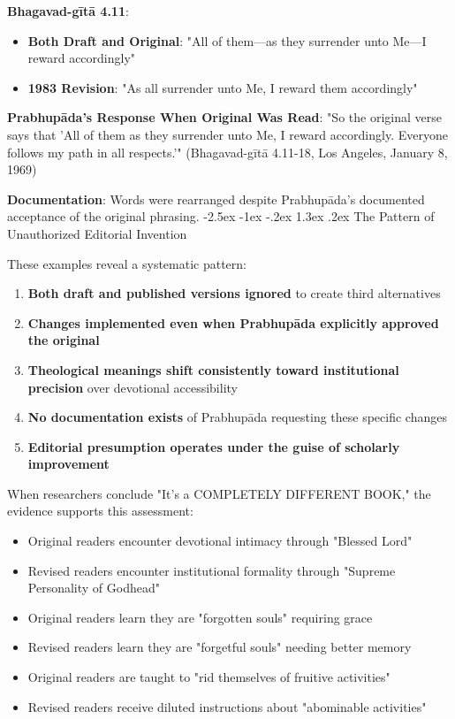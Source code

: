 \documentclass[12pt,twoside]{book}
\makeatletter
\renewcommand\section{\@startsection{section}{1}{\z@}%
{-2.5ex \@plus -1ex \@minus -.2ex}%
{1.3ex \@plus.2ex}%
{\normalfont\Large\bfseries}}
\makeatother
\begin{document}
\textbf{\textbf{Bhagavad-gītā 4.11}}:
\begin{itemize}
\item \textbf{\textbf{Both Draft and Original}}: "All of them—as they surrender unto Me—I reward accordingly"
\item \textbf{\textbf{1983 Revision}}: "As all surrender unto Me, I reward them accordingly"
\end{itemize}

\textbf{\textbf{Prabhupāda's Response When Original Was Read}}: "So the original verse says that 'All of them as they surrender unto Me, I reward accordingly. Everyone follows my path in all respects.'" (Bhagavad-gītā 4.11-18, Los Angeles, January 8, 1969)

\textbf{\textbf{Documentation}}: Words were rearranged despite Prabhupāda's documented acceptance of the original phrasing.
\section{The Pattern of Unauthorized Editorial Invention}
\label{sec:org23a3934}

These examples reveal a systematic pattern:
\begin{enumerate}
\item \textbf{\textbf{Both draft and published versions ignored}} to create third alternatives
\item \textbf{\textbf{Changes implemented even when Prabhupāda explicitly approved the original}}
\item \textbf{\textbf{Theological meanings shift consistently toward institutional precision}} over devotional accessibility
\item \textbf{\textbf{No documentation exists}} of Prabhupāda requesting these specific changes
\item \textbf{\textbf{Editorial presumption operates under the guise of scholarly improvement}}
\end{enumerate}

When researchers conclude "It's a COMPLETELY DIFFERENT BOOK," the evidence supports this assessment:

\begin{itemize}
\item Original readers encounter devotional intimacy through "Blessed Lord"
\item Revised readers encounter institutional formality through "Supreme Personality of Godhead"
\item Original readers learn they are "forgotten souls" requiring grace
\item Revised readers learn they are "forgetful souls" needing better memory
\item Original readers are taught to "rid themselves of fruitive activities"
\item Revised readers receive diluted instructions about "abominable activities"
\end{itemize}
\end{document}
